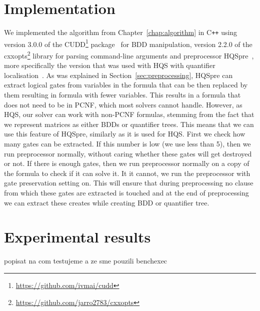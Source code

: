 \documentclass[
  digital, %
  twoside, %
  table,   %
  nolof,     %
  nolot,     %
]{fithesis3}
\theoremstyle{definition}
\theoremstyle{remark}
\begin{document}
\begin{itemize}
\end{itemize}

\chapter{Implementation}
We implemented the algorithm from Chapter~\ref{chap:algorithm} in C\texttt{++} using version 3.0.0 of the CUDD\footnote{\url{https://github.com/ivmai/cudd}} package~\cite{CUDD} for BDD manipulation, version 2.2.0 of the cxxopts\footnote{\url{https://github.com/jarro2783/cxxopts}} library for parsing command-line arguments and preprocessor HQSpre~\cite{HQSpre2}, more specifically the version that was used with HQS with quantifier localisation~\cite{HQSquantifierLocalization}. As was explained in Section~\ref{sec:preprocessing}, HQSpre can extract logical gates from variables in the formula that can be then replaced by them resulting in formula with fewer variables. This results in a formula that does not need to be in PCNF, which most solvers cannot handle. However, as HQS, our solver can work with non-PCNF formulas, stemming from the fact that we represent matrices as either BDDs or quantifier trees. This means that we can use this feature of HQSpre, similarly as it is used for HQS. First we check how many gates can be extracted. If this number is low (we use less than 5), then we run preprocessor normally, without caring whether these gates will get destroyed or not. If there is enough gates, then we run preprocessor normally on a copy of the formula to check if it can solve it. It it cannot, we run the preprocessor with gate preservation setting on. This will ensure that during preprocessing no clause from which these gates are extracted is touched and at the end of preprocessing we can extract these creates while creating BDD or quantifier tree.


\chapter{Experimental results}
popisat na com testujeme a ze sme pouzili benchexec
\end{document}
